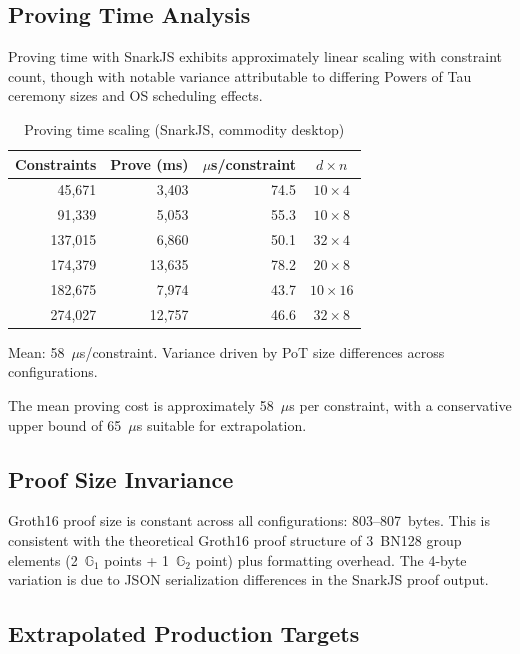 \subsection{Proving Time Analysis}

Proving time with SnarkJS exhibits approximately linear scaling with
constraint count, though with notable variance attributable to
differing Powers of Tau ceremony sizes and OS scheduling effects.

\begin{table}[htbp]
\centering
\caption{Proving time scaling (SnarkJS, commodity desktop)}
\label{tab:proving-time}
\begin{tabular}{@{}rrrc@{}}
\toprule
Constraints & Prove (ms) & $\mu$s/constraint & $d \times n$ \\
\midrule
 45,671 &  3,403 & 74.5 & $10 \times 4$ \\
 91,339 &  5,053 & 55.3 & $10 \times 8$ \\
137,015 &  6,860 & 50.1 & $32 \times 4$ \\
174,379 & 13,635 & 78.2 & $20 \times 8$ \\
182,675 &  7,974 & 43.7 & $10 \times 16$ \\
274,027 & 12,757 & 46.6 & $32 \times 8$ \\
\bottomrule
\end{tabular}
\par\vspace{1mm}
\parbox{\columnwidth}{\footnotesize Mean: 58~$\mu$s/constraint. Variance driven by PoT size
differences across configurations.}
\end{table}
\FloatBarrier

The mean proving cost is approximately 58~$\mu$s per constraint, with
a conservative upper bound of 65~$\mu$s suitable for extrapolation.

\subsection{Proof Size Invariance}

Groth16 proof size is constant across all configurations: 803--807~bytes.
This is consistent with the theoretical Groth16 proof structure of
3~BN128 group elements (2~$\mathbb{G}_1$ points + 1~$\mathbb{G}_2$ point)
plus formatting overhead. The 4-byte variation is due to JSON
serialization differences in the SnarkJS proof output.

\subsection{Extrapolated Production Targets}

